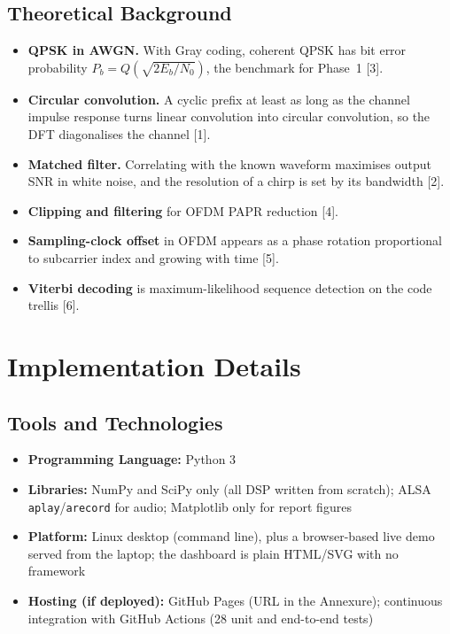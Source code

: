 \documentclass[11pt,a4paper]{report}
\begin{document}
\section{Theoretical Background}
\begin{itemize}
    \item \textbf{QPSK in AWGN.} With Gray coding, coherent QPSK has bit error
    probability $P_b = Q\left(\sqrt{2E_b/N_0}\right)$, the benchmark for Phase~1
    [3].
    \item \textbf{Circular convolution.} A cyclic prefix at least as long as the channel
    impulse response turns linear convolution into circular convolution, so the DFT
    diagonalises the channel [1].
    \item \textbf{Matched filter.} Correlating with the known waveform maximises output
    SNR in white noise, and the resolution of a chirp is set by its bandwidth
    [2].
    \item \textbf{Clipping and filtering} for OFDM PAPR reduction [4].
    \item \textbf{Sampling-clock offset} in OFDM appears as a phase rotation
    proportional to subcarrier index and growing with time [5].
    \item \textbf{Viterbi decoding} is maximum-likelihood sequence detection on the
    code trellis [6].
\end{itemize}

\chapter{Implementation Details}

\section{Tools and Technologies}
\begin{itemize}
    \item \textbf{Programming Language:} Python 3
    \item \textbf{Libraries:} NumPy and SciPy only (all DSP written from scratch); ALSA
    \texttt{aplay}/\texttt{arecord} for audio; Matplotlib only for report figures
    \item \textbf{Platform:} Linux desktop (command line), plus a browser-based live
    demo served from the laptop; the dashboard is plain HTML/SVG with no framework
    \item \textbf{Hosting (if deployed):} GitHub Pages (URL in the Annexure);
    continuous integration with GitHub Actions (28 unit and end-to-end tests)
\end{itemize}
\end{document}
